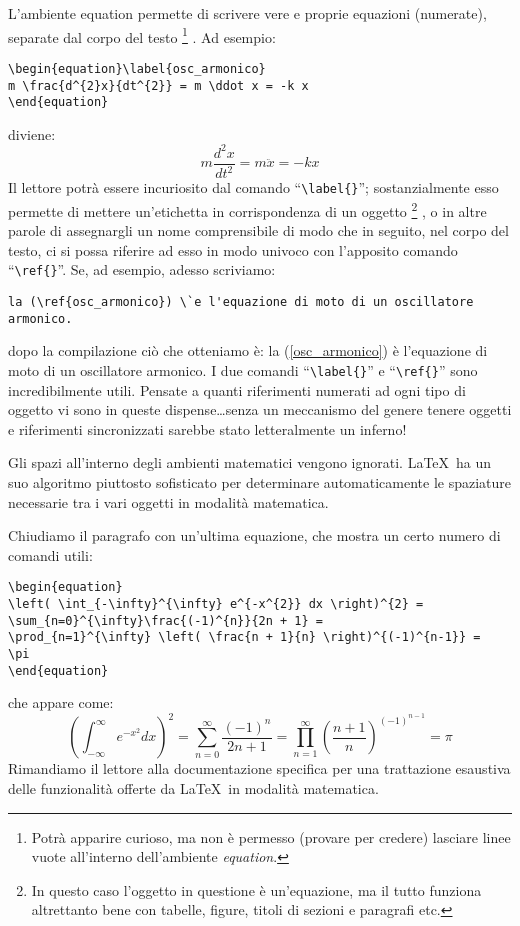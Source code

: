 L'ambiente equation permette di scrivere vere e proprie equazioni (numerate),
separate dal corpo del testo%
\footnote{
Potr\`a apparire curioso, ma non \`e permesso (provare per credere) lasciare
linee vuote all'interno dell'ambiente \emph{equation}.
}%
. Ad esempio:
\begin{verbatim}
\begin{equation}\label{osc_armonico}
m \frac{d^{2}x}{dt^{2}} = m \ddot x = -k x
\end{equation}
\end{verbatim}
diviene:
\begin{equation}\label{osc_armonico}
m \frac{d^{2}x}{dt^{2}} = m \ddot x = -k x
\end{equation}
Il lettore potr\`a essere incuriosito dal comando ``\verb|\label{}|'';
sostanzialmente esso permette di mettere un'etichetta in corrispondenza di un
oggetto%
\footnote{
In questo caso l'oggetto in questione \`e un'equazione, ma il tutto funziona
altrettanto bene con tabelle, figure, titoli di sezioni e paragrafi etc.
}%
, o in altre parole di assegnargli un nome comprensibile di modo che in
seguito, nel corpo del testo, ci si possa riferire ad esso in modo
univoco con l'apposito comando ``\verb|\ref{}|''.
Se, ad esempio, adesso scriviamo:
\begin{verbatim}
la (\ref{osc_armonico}) \`e l'equazione di moto di un oscillatore armonico.
\end{verbatim}
dopo la compilazione ci\`o che otteniamo \`e:
la (\ref{osc_armonico}) \`e l'equazione di moto di un oscillatore armonico.
I due comandi ``\verb|\label{}|'' e ``\verb|\ref{}|'' sono incredibilmente
utili.
Pensate a quanti riferimenti numerati ad ogni tipo di oggetto vi sono in queste
dispense\ldots senza un meccanismo del genere tenere oggetti e riferimenti
sincronizzati sarebbe stato letteralmente un inferno!

Gli spazi all'interno degli ambienti matematici vengono ignorati.
\LaTeX\ ha un suo algoritmo piuttosto sofisticato per determinare
automaticamente le spaziature necessarie tra i vari oggetti in modalit\`a
matematica.

Chiudiamo il paragrafo con un'ultima equazione, che mostra un certo numero
di comandi utili:
\begin{verbatim}
\begin{equation}
\left( \int_{-\infty}^{\infty} e^{-x^{2}} dx \right)^{2} =
\sum_{n=0}^{\infty}\frac{(-1)^{n}}{2n + 1} =
\prod_{n=1}^{\infty} \left( \frac{n + 1}{n} \right)^{(-1)^{n-1}} =
\pi
\end{equation}
\end{verbatim}
che appare come:
\begin{equation}
\left( \int_{-\infty}^{\infty} e^{-x^{2}} dx \right)^{2} =
\sum_{n=0}^{\infty}\frac{(-1)^{n}}{2n + 1} =
\prod_{n=1}^{\infty} \left( \frac{n + 1}{n} \right)^{(-1)^{n-1}} =
\pi
\end{equation}
Rimandiamo il lettore alla documentazione specifica per una trattazione
esaustiva delle funzionalit\`a offerte da \LaTeX\ in modalit\`a matematica.


